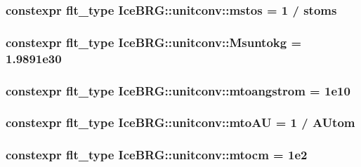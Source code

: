 \subsubsection[{mstos}]{\setlength{\rightskip}{0pt plus 5cm}constexpr {\bf flt\+\_\+type} Ice\+B\+R\+G\+::unitconv\+::mstos = 1 / {\bf stoms}}\label{namespaceIceBRG_1_1unitconv_a9d405defd89708f095c3e3a468e6aafa}
\hypertarget{namespaceIceBRG_1_1unitconv_a007b726a8cad8ef07724c277686b8ef8}{}
\subsubsection[{Msuntokg}]{\setlength{\rightskip}{0pt plus 5cm}constexpr {\bf flt\+\_\+type} Ice\+B\+R\+G\+::unitconv\+::\+Msuntokg = 1.\+9891e30}\label{namespaceIceBRG_1_1unitconv_a007b726a8cad8ef07724c277686b8ef8}
\hypertarget{namespaceIceBRG_1_1unitconv_ae7bd0b00a98825c753a78179964ca15c}{}
\subsubsection[{mtoangstrom}]{\setlength{\rightskip}{0pt plus 5cm}constexpr {\bf flt\+\_\+type} Ice\+B\+R\+G\+::unitconv\+::mtoangstrom = 1e10}\label{namespaceIceBRG_1_1unitconv_ae7bd0b00a98825c753a78179964ca15c}
\hypertarget{namespaceIceBRG_1_1unitconv_af55863b6985a1efa76c6dcd18163e119}{}
\subsubsection[{mto\+A\+U}]{\setlength{\rightskip}{0pt plus 5cm}constexpr {\bf flt\+\_\+type} Ice\+B\+R\+G\+::unitconv\+::mto\+A\+U = 1 / {\bf A\+Utom}}\label{namespaceIceBRG_1_1unitconv_af55863b6985a1efa76c6dcd18163e119}
\hypertarget{namespaceIceBRG_1_1unitconv_a7df943f40f1d4d1d3cb6aeae549a34f9}{}
\subsubsection[{mtocm}]{\setlength{\rightskip}{0pt plus 5cm}constexpr {\bf flt\+\_\+type} Ice\+B\+R\+G\+::unitconv\+::mtocm = 1e2}\label{namespaceIceBRG_1_1unitconv_a7df943f40f1d4d1d3cb6aeae549a34f9}
\hypertarget{namespaceIceBRG_1_1unitconv_aaf08afc8ae31133c13dbdc80e88f5c44}{}
